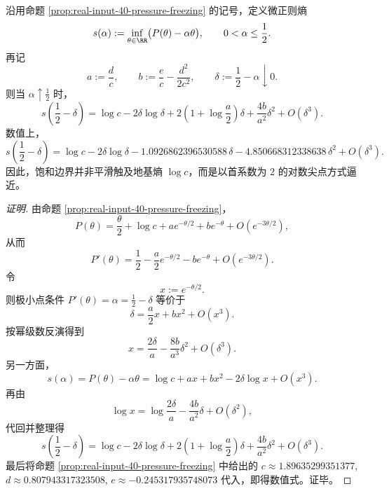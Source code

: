 \begin{conclusion}[饱和边界微正则熵的二阶对数尖点展开]\label{con:xi-terminal-real-input-output-microcanonical-logcusp-second-order}
沿用命题 \ref{prop:real-input-40-pressure-freezing} 的记号，定义微正则熵
\[
s(\alpha):=\inf_{\theta\in\RR}\bigl(P(\theta)-\alpha\theta\bigr),
\qquad
0<\alpha\le \frac12.
\]
再记
\[
a:=\frac{d}{c},
\qquad
b:=\frac{e}{c}-\frac{d^2}{2c^2},
\qquad
\delta:=\frac12-\alpha\downarrow 0.
\]
则当 \(\alpha\uparrow \frac12\) 时，
\[
s\!\left(\frac12-\delta\right)
=
\log c
-2\delta\log\delta
+2\left(1+\log\frac{a}{2}\right)\delta
+\frac{4b}{a^2}\delta^2
+O(\delta^3).
\]
数值上，
\[
s\!\left(\frac12-\delta\right)
=
\log c
-2\delta\log\delta
-1.0926862396530588\,\delta
-4.850668312338638\,\delta^2
+O(\delta^3).
\]
因此，饱和边界并非平滑触及地基熵 \(\log c\)，而是以首系数为 \(2\) 的对数尖点方式逼近。
\end{conclusion}
\begin{proof}[证明]
由命题 \ref{prop:real-input-40-pressure-freezing}，
\[
P(\theta)
=
\frac{\theta}{2}+\log c+a e^{-\theta/2}+b e^{-\theta}+O(e^{-3\theta/2}),
\]
从而
\[
P'(\theta)
=
\frac12-\frac{a}{2}e^{-\theta/2}-b e^{-\theta}+O(e^{-3\theta/2}).
\]
令
\[
x:=e^{-\theta/2}.
\]
则极小点条件 \(P'(\theta)=\alpha=\frac12-\delta\) 等价于
\[
\delta=\frac{a}{2}x+b x^2+O(x^3).
\]
按幂级数反演得到
\[
x=\frac{2\delta}{a}-\frac{8b}{a^3}\delta^2+O(\delta^3).
\]
另一方面，
\[
s(\alpha)=P(\theta)-\alpha\theta
=
\log c+a x+b x^2-2\delta\log x+O(x^3).
\]
再由
\[
\log x
=
\log\frac{2\delta}{a}
-\frac{4b}{a^2}\delta
+O(\delta^2),
\]
代回并整理得
\[
s\!\left(\frac12-\delta\right)
=
\log c
-2\delta\log\delta
+2\left(1+\log\frac{a}{2}\right)\delta
+\frac{4b}{a^2}\delta^2
+O(\delta^3).
\]
最后将命题 \ref{prop:real-input-40-pressure-freezing} 中给出的
\(
c\approx 1.89635299351377
\),
\(
d\approx 0.807943317323508
\),
\(
e\approx -0.245317935748073
\)
代入，即得数值式。证毕。
\end{proof}
